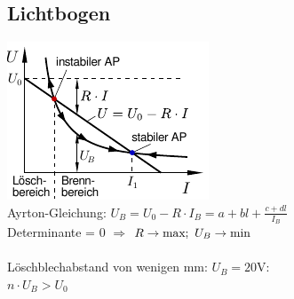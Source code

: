 \documentclass[fs, footer]{latex4ei}
\begin{document}
\begin{multicols}{4}
	\subsection{Lichtbogen}
	\includegraphics{./img/Lichtbogen.pdf}\\
	Ayrton-Gleichung: $U_B = U_0 - R \cdot I_B = a + bl + \frac{c+dl}{I_B}$\\
	Determinante = 0 \quad $\Longrightarrow$ \quad $R \rightarrow \text{max};\ U_{B} \rightarrow \text{min}$\\
	\\
	Löschblechabstand von wenigen mm: $U_B = 20$V:\\
	$n \cdot U_B > U_0$






\end{multicols}

\end{document}
